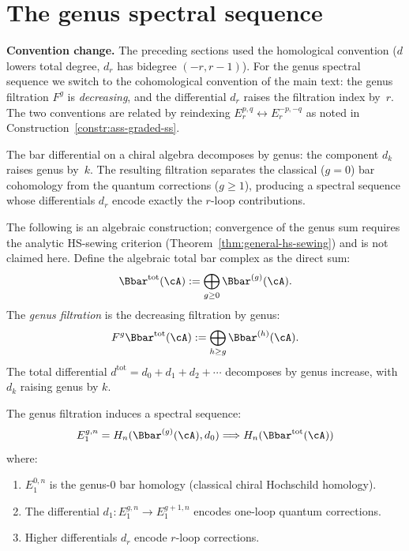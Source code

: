 \section{The genus spectral sequence}
\label{sec:genus-spectral-sequence}

\medskip\noindent\textbf{Convention change.} The preceding sections used the homological convention ($d$ lowers total degree, $d_r$ has bidegree $(-r,r{-}1)$). For the genus spectral sequence we switch to the cohomological convention of the main text: the genus filtration $F^g$ is \emph{decreasing}, and the differential $d_r$ raises the filtration index by~$r$. The two conventions are related by reindexing $E_r^{p,q} \leftrightarrow E_r^{-p,-q}$ as noted in Construction~\ref{constr:ass-graded-ss}.

\medskip
The bar differential on a chiral algebra decomposes by genus: the
component $d_k$ raises genus by~$k$. The resulting filtration
separates the classical ($g = 0$) bar cohomology from the quantum
corrections ($g \geq 1$), producing a spectral sequence whose
differentials $d_r$ encode exactly the $r$-loop contributions.

\begin{construction}
\label{constr:genus-filtration}
The following is an algebraic construction; convergence of the genus sum
requires the analytic HS-sewing criterion (Theorem~\ref{thm:general-hs-sewing})
and is not claimed here. Define the algebraic total bar complex as the direct sum:
\[
\Bbar^{\mathrm{tot}}(\cA) := \bigoplus_{g \geq 0} \Bbar^{(g)}(\cA).
\]
The \emph{genus filtration} is the decreasing filtration by genus:
\[
F^g \Bbar^{\mathrm{tot}}(\cA) := \bigoplus_{h \geq g} \Bbar^{(h)}(\cA).
\]
The total differential $d^{\mathrm{tot}} = d_0 + d_1 + d_2 + \cdots$ decomposes
by genus increase, with $d_k$ raising genus by $k$.
\end{construction}

\begin{theorem}
\label{thm:genus-ss}
The genus filtration induces a spectral sequence:
\[
E_1^{g,n} = H_n(\Bbar^{(g)}(\cA), d_0) \Longrightarrow H_n(\Bbar^{\mathrm{tot}}(\cA))
\]
where:
\begin{enumerate}[label=(\roman*)]
\item $E_1^{0,n}$ is the genus-0 bar homology (classical chiral Hochschild homology).
\item The differential $d_1: E_1^{g,n} \to E_1^{g+1,n}$ encodes one-loop quantum
corrections.
\item Higher differentials $d_r$ encode $r$-loop corrections.
\end{enumerate}
\end{theorem}

